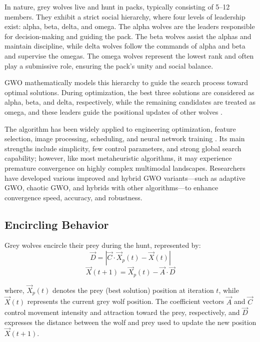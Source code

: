 \documentclass[12pt,a4paper]{article}
\begin{document}
In nature, grey wolves live and hunt in packs, typically consisting of 5–12 members. They exhibit a strict social hierarchy, where four levels of leadership exist: alpha, beta, delta, and omega. The alpha wolves are the leaders responsible for decision-making and guiding the pack. The beta wolves assist the alphas and maintain discipline, while delta wolves follow the commands of alpha and beta and supervise the omegas. The omega wolves represent the lowest rank and often play a submissive role, ensuring the pack’s unity and social balance.

GWO mathematically models this hierarchy to guide the search process toward optimal solutions. During optimization, the best three solutions are considered as alpha, beta, and delta, respectively, while the remaining candidates are treated as omega, and these leaders guide the positional updates of other wolves \cite{banaie2021}.

The algorithm has been widely applied to engineering optimization, feature selection, image processing, scheduling, and neural network training \cite{elaziz2021}. Its main strengths include simplicity, few control parameters, and strong global search capability; however, like most metaheuristic algorithms, it may experience premature convergence on highly complex multimodal landscapes. Researchers have developed various improved and hybrid GWO variants—such as adaptive GWO, chaotic GWO, and hybrids with other algorithms—to enhance convergence speed, accuracy, and robustness.
\subsection{Encircling Behavior}
Grey wolves encircle their prey during the hunt, represented by:
\begin{equation}
\vec{D} = \left| \vec{C} \cdot \vec{X}_p(t) - \vec{X}(t) \right|
\label{eq:gwo_encircle_D}
\end{equation}
\begin{equation}
\vec{X}(t+1) = \vec{X}_p(t) - \vec{A} \cdot \vec{D}
\label{eq:gwo_encircle_update}
\end{equation}

where, $\vec{X}_p(t)$ denotes the prey (best solution) position at iteration $t$, while $\vec{X}(t)$ represents the current grey wolf position. The coefficient vectors $\vec{A}$ and $\vec{C}$ control movement intensity and attraction toward the prey, respectively, and $\vec{D}$ expresses the distance between the wolf and prey used to update the new position $\vec{X}(t+1)$.
\end{document}

